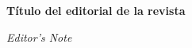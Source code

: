 
\renewcommand{\articuloidiomaxml}{es}
\renewcommand{\articulotitulo}{Título del editorial de la revista}
\renewcommand{\articuloautores}{Luciana Victoria Gil}
\renewcommand{\articulodoi}{doi}
\renewcommand{\articulotipo}{EDITORIAL}
\renewcommand{\articulorevista}{H-industria}
\renewcommand{\articuloissne}{1851-703X}
\renewcommand{\articulovolumen}{01}
\renewcommand{\articulonumero}{01}
\renewcommand{\articulofecha}{ 2026}
\renewcommand{\articulopagina}{1}

\setcounter{page}{1}
\thispagestyle{firstpage}

\noindent\begin{minipage}[t]{\dimexpr\textwidth+\marginparsep+\marginparwidth\relax}%
{\sffamily\bfseries\Large\articulotitulo\par}%
\end{minipage}\par
\vspace{3mm}%
\renewcommand{\articulotitulotrans}{Editor's Note}
\noindent\begin{minipage}[t]{\dimexpr\textwidth+\marginparsep+\marginparwidth\relax}%
{\sffamily\itshape\normalsize\articulotitulotrans\par}%
\end{minipage}\par
\vspace{4mm}%

